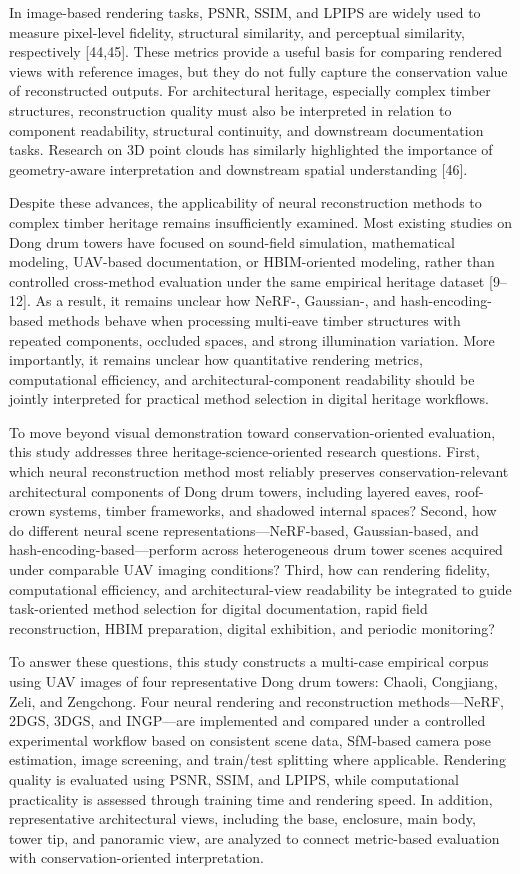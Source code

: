 In image-based rendering tasks, PSNR, SSIM, and LPIPS are widely used to
measure pixel-level fidelity, structural similarity, and perceptual
similarity, respectively {[}44,45{]}. These metrics provide a useful
basis for comparing rendered views with reference images, but they do
not fully capture the conservation value of reconstructed outputs. For
architectural heritage, especially complex timber structures,
reconstruction quality must also be interpreted in relation to component
readability, structural continuity, and downstream documentation tasks.
Research on 3D point clouds has similarly highlighted the importance of
geometry-aware interpretation and downstream spatial understanding
{[}46{]}.

Despite these advances, the applicability of neural reconstruction
methods to complex timber heritage remains insufficiently examined. Most
existing studies on Dong drum towers have focused on sound-field
simulation, mathematical modeling, UAV-based documentation, or
HBIM-oriented modeling, rather than controlled cross-method evaluation
under the same empirical heritage dataset {[}9--12{]}. As a result, it
remains unclear how NeRF-, Gaussian-, and hash-encoding-based methods
behave when processing multi-eave timber structures with repeated
components, occluded spaces, and strong illumination variation. More
importantly, it remains unclear how quantitative rendering metrics,
computational efficiency, and architectural-component readability should
be jointly interpreted for practical method selection in digital
heritage workflows.

To move beyond visual demonstration toward conservation-oriented
evaluation, this study addresses three heritage-science-oriented
research questions. First, which neural reconstruction method most
reliably preserves conservation-relevant architectural components of
Dong drum towers, including layered eaves, roof-crown systems, timber
frameworks, and shadowed internal spaces? Second, how do different
neural scene representations---NeRF-based, Gaussian-based, and
hash-encoding-based---perform across heterogeneous drum tower scenes
acquired under comparable UAV imaging conditions? Third, how can
rendering fidelity, computational efficiency, and architectural-view
readability be integrated to guide task-oriented method selection for
digital documentation, rapid field reconstruction, HBIM preparation,
digital exhibition, and periodic monitoring?

To answer these questions, this study constructs a multi-case empirical
corpus using UAV images of four representative Dong drum towers: Chaoli,
Congjiang, Zeli, and Zengchong. Four neural rendering and reconstruction
methods---NeRF, 2DGS, 3DGS, and INGP---are implemented and compared
under a controlled experimental workflow based on consistent scene data,
SfM-based camera pose estimation, image screening, and train/test
splitting where applicable. Rendering quality is evaluated using PSNR,
SSIM, and LPIPS, while computational practicality is assessed through
training time and rendering speed. In addition, representative
architectural views, including the base, enclosure, main body, tower
tip, and panoramic view, are analyzed to connect metric-based evaluation
with conservation-oriented interpretation.

